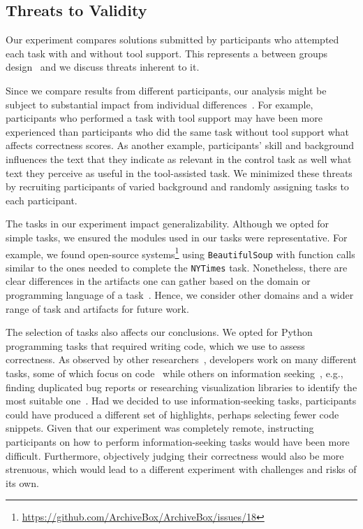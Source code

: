 
\subsection{Threats to Validity}
\label{cp6:threats}




Our experiment compares solutions submitted by participants who attempted each task with and without tool support. 
This represents a between groups design~\cite{Lazar2017} and we discuss threats inherent to it. 



Since we compare results from different participants, our analysis might be subject to substantial 
impact from individual differences~\cite{Lazar2017}. 
For example, participants who performed a task with tool support may have been more experienced than participants 
who did the same task without tool support what affects correctness scores.
As another example,  participants' skill and background 
influences the text that they indicate as relevant in the control task as well 
what text they perceive as useful in the tool-assisted task. 
We minimized these threats by recruiting participants of varied background and randomly
assigning tasks to each participant.



The tasks in our experiment impact generalizability. 
Although we opted for simple tasks, we ensured the 
modules used in our tasks were representative. 
For example, we found open-source systems\footnote{\url{https://github.com/ArchiveBox/ArchiveBox/issues/18}} using \texttt{BeautifulSoup} 
with function calls similar to the ones needed to complete the \texttt{NYTimes} task.
Nonetheless, there are clear differences in the artifacts one can gather 
based on the domain or programming language of a task~\cite{baltes2020}.
Hence, we consider other domains and a wider range of task 
and artifacts for future work. 



The selection of tasks also affects our conclusions. We opted for Python programming tasks that 
required writing code, which we use to assess correctness. 
As observed by other researchers~\cite{satterfield2020, meyer2020}, developers
work on many different tasks, some of which focus on code~\cite{Meyer2017}
while others on information seeking~\cite{gonccalves2011}, e.g., finding duplicated bug reports or researching visualization libraries to identify the most suitable one~\cite{satterfield2020}.
Had we decided to use information-seeking tasks, participants could have produced a different set of highlights,
perhaps selecting fewer code snippets. 
Given that 
our experiment was completely remote, instructing participants on how to perform information-seeking 
tasks would have been more difficult. Furthermore, objectively judging their correctness 
would also be more strenuous, which would lead to a different experiment with challenges and risks of its own.




